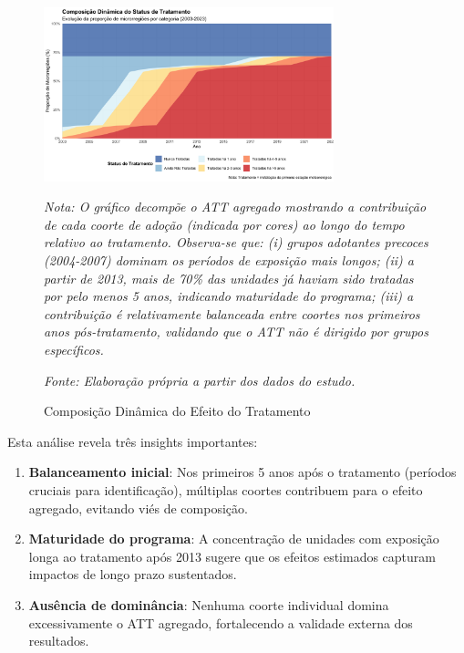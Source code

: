 \documentclass[
	12pt,				%
	oneside,			%
	a4paper,			%
	english,			%
	french,				%
	spanish,			%
	brazil				%
	]{abntex2}
\begin{document}
\begin{figure}[H]
\centering
\caption{Composição Dinâmica do Efeito do Tratamento}
\label{fig:composition}
\includegraphics[width=0.75\textwidth]{../../../data/outputs/additional_figures/treatment_composition_dynamic.png}

\textit{Nota: O gráfico decompõe o ATT agregado mostrando a contribuição de cada coorte de adoção (indicada por cores) ao longo do tempo relativo ao tratamento. Observa-se que: (i) grupos adotantes precoces (2004-2007) dominam os períodos de exposição mais longos; (ii) a partir de 2013, mais de 70\% das unidades já haviam sido tratadas por pelo menos 5 anos, indicando maturidade do programa; (iii) a contribuição é relativamente balanceada entre coortes nos primeiros anos pós-tratamento, validando que o ATT não é dirigido por grupos específicos.}

\textit{Fonte: Elaboração própria a partir dos dados do estudo.}
\end{figure}

Esta análise revela três insights importantes:

\begin{enumerate}
\item \textbf{Balanceamento inicial}: Nos primeiros 5 anos após o tratamento (períodos cruciais para identificação), múltiplas coortes contribuem para o efeito agregado, evitando viés de composição.

\item \textbf{Maturidade do programa}: A concentração de unidades com exposição longa ao tratamento após 2013 sugere que os efeitos estimados capturam impactos de longo prazo sustentados.

\item \textbf{Ausência de dominância}: Nenhuma coorte individual domina excessivamente o ATT agregado, fortalecendo a validade externa dos resultados.
\end{enumerate}
\end{document}
